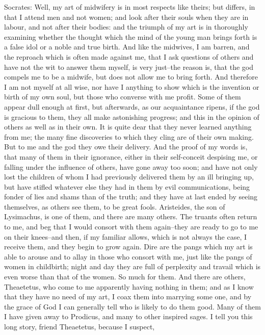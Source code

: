 Socrates: Well, my art of midwifery is in most respects like theirs; but
differs, in that I attend men and not women; and look after their souls
when they are in labour, and not after their bodies: and the triumph of
my art is in thoroughly examining whether the thought which the mind of
the young man brings forth is a false idol or a noble and true birth.
And like the midwives, I am barren, and the reproach which is often
made against me, that I ask questions of others and have not the wit to
answer them myself, is very just--the reason is, that the god compels me
to be a midwife, but does not allow me to bring forth. And therefore
I am not myself at all wise, nor have I anything to show which is
the invention or birth of my own soul, but those who converse with me
profit. Some of them appear dull enough at first, but afterwards, as
our acquaintance ripens, if the god is gracious to them, they all make
astonishing progress; and this in the opinion of others as well as in
their own. It is quite dear that they never learned anything from me;
the many fine discoveries to which they cling are of their own making.
But to me and the god they owe their delivery. And the proof of my words
is, that many of them in their ignorance, either in their self-conceit
despising me, or falling under the influence of others, have gone away
too soon; and have not only lost the children of whom I had previously
delivered them by an ill bringing up, but have stifled whatever else
they had in them by evil communications, being fonder of lies and shams
than of the truth; and they have at last ended by seeing themselves, as
others see them, to be great fools. Aristeides, the son of Lysimachus,
is one of them, and there are many others. The truants often return to
me, and beg that I would consort with them again--they are ready to
go to me on their knees--and then, if my familiar allows, which is not
always the case, I receive them, and they begin to grow again. Dire
are the pangs which my art is able to arouse and to allay in those who
consort with me, just like the pangs of women in childbirth; night and
day they are full of perplexity and travail which is even worse than
that of the women. So much for them. And there are others, Theaetetus,
who come to me apparently having nothing in them; and as I know that
they have no need of my art, I coax them into marrying some one, and
by the grace of God I can generally tell who is likely to do them good.
Many of them I have given away to Prodicus, and many to other inspired
sages. I tell you this long story, friend Theaetetus, because I suspect,

